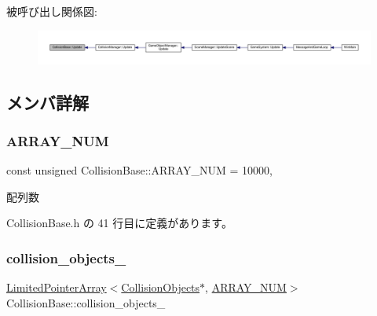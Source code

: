 被呼び出し関係図\+:
\nopagebreak
\begin{figure}[H]
\begin{center}
\leavevmode
\includegraphics[width=350pt]{class_collision_base_a0f967cf5de4178ee99f434c3ff4f16fd_icgraph}
\end{center}
\end{figure}


\subsection{メンバ詳解}
\mbox{\label{class_collision_base_a0ddcdd5ed993b19c6edabd9c50e76ba4}} 
\subsubsection{\texorpdfstring{A\+R\+R\+A\+Y\+\_\+\+N\+UM}{ARRAY\_NUM}}
{\footnotesize\ttfamily const unsigned Collision\+Base\+::\+A\+R\+R\+A\+Y\+\_\+\+N\+UM = 10000\hspace{0.3cm}{\ttfamily [static]}, {\ttfamily [private]}}



配列数 



 Collision\+Base.\+h の 41 行目に定義があります。

\mbox{\label{class_collision_base_a9ef8dfac9a07e31cb1d058b6a22e9640}} 
\subsubsection{\texorpdfstring{collision\+\_\+objects\+\_\+}{collision\_objects\_}}
{\footnotesize\ttfamily \mbox{\hyperlink{class_limited_pointer_array}{Limited\+Pointer\+Array}}$<$\mbox{\hyperlink{class_collision_objects}{Collision\+Objects}}$\ast$, \mbox{\hyperlink{class_collision_base_a0ddcdd5ed993b19c6edabd9c50e76ba4}{A\+R\+R\+A\+Y\+\_\+\+N\+UM}}$>$ Collision\+Base\+::collision\+\_\+objects\+\_\+\hspace{0.3cm}{\ttfamily [private]}}




